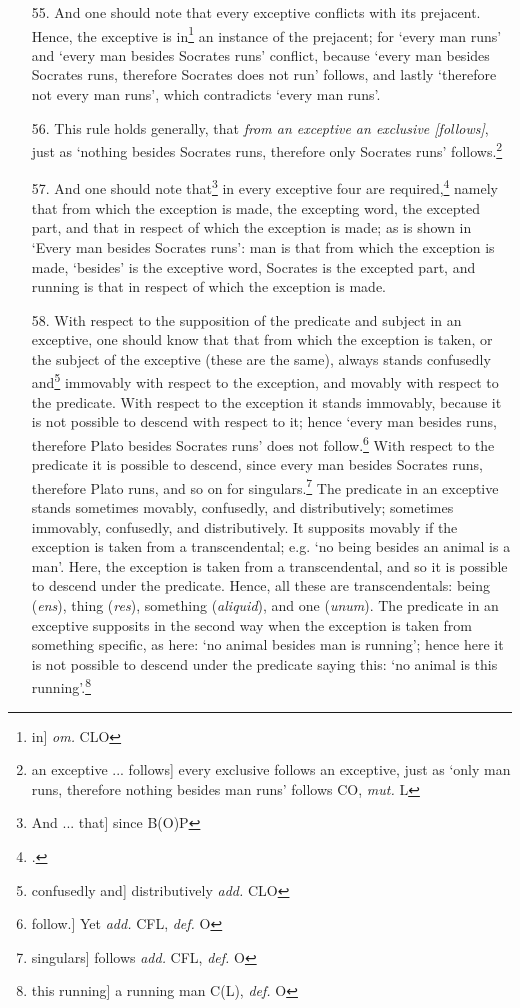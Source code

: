 \begin{itemize}
\item[55.] And one should note that every exceptive conflicts with its prejacent. Hence, the exceptive is in\footnote{in] \textit{om.} CLO} an instance of the prejacent; for `every man runs' and `every man besides Socrates runs' conflict, because `every man besides Socrates runs, therefore Socrates does not run' follows, and lastly `therefore not every man runs', which contradicts `every man runs'.
\item[56.] This rule holds generally, that \textit{from an exceptive an exclusive [follows]}, just as `nothing besides Socrates runs, therefore only Socrates runs' follows.\footnote{an exceptive ... follows] every exclusive follows an exceptive, just as `only man runs, therefore nothing besides man runs' follows CO, \textit{mut.} L}
\item[57.] And one should note that\footnote{And ... that] since B(O)P} in every exceptive four are required,\footnote{\cite[p. 165.16]{BurleyDPAL}.} namely that from which the exception is made, the excepting word, the excepted part, and that in respect of which the exception is made; as is shown in `Every man besides Socrates runs': man is that from which the exception is made, `besides' is the exceptive word, Socrates is the excepted part, and running is that in respect of which the exception is made.
\item[58.] With respect to the supposition of the predicate and subject in an exceptive, one should know that that from which the exception is taken, or the subject of the exceptive (these are the same), always stands confusedly and\footnote{confusedly and] distributively \textit{add.} CLO} immovably with respect to the exception, and movably with respect to the predicate. With respect to the exception it stands immovably, because it is not possible to descend with respect to it; hence `every man besides runs, therefore Plato besides Socrates runs' does not follow.\footnote{follow.] Yet \textit{add.} CFL, \textit{def.} O} With respect to the predicate it is possible to descend, since every man besides Socrates runs, therefore Plato runs, and so on for singulars.\footnote{singulars] follows \textit{add.} CFL, \textit{def.} O} The predicate in an exceptive stands sometimes movably, confusedly, and distributively; sometimes immovably, confusedly, and distributively. It supposits movably if the exception is taken from a transcendental; e.g. `no being besides an animal is a man'. Here, the exception is taken from a transcendental, and so it is possible to descend under the predicate. Hence, all these are transcendentals: being (\textit{ens}), thing (\textit{res}), something (\textit{aliquid}), and one (\textit{unum}). The predicate in an exceptive supposits in the second way when the exception is taken from something specific, as here: `no animal besides man is running'; hence here it is not possible to descend under the predicate saying this: `no animal is this running'.\footnote{this running] a running man C(L), \textit{def.} O}

\end{itemize}
